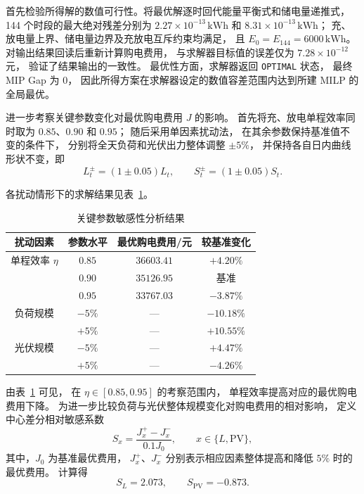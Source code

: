 \documentclass[zihao=-4,a4paper,UTF8,fontset=none]{ctexart}
\begin{document}
首先检验所得解的数值可行性。将最优解逐时回代能量平衡式和储电量递推式，
144 个时段的最大绝对残差分别为
$2.27\times10^{-13}\,\mathrm{kWh}$
和
$8.31\times10^{-13}\,\mathrm{kWh}$；
充、放电量上界、储电量边界及充放电互斥约束均满足，
且 $E_0=E_{144}=6000\,\mathrm{kWh}$。
对输出结果回读后重新计算购电费用，
与求解器目标值的误差仅为
$7.28\times10^{-12}$ 元，
验证了结果输出的一致性。
最优性方面，求解器返回 \texttt{OPTIMAL} 状态，
最终 MIP Gap 为 0，
因此所得方案在求解器设定的数值容差范围内达到所建 MILP 的全局最优。

进一步考察关键参数变化对最优购电费用 $J$ 的影响。
首先将充、放电单程效率同时取为 $0.85$、$0.90$ 和 $0.95$；
随后采用单因素扰动法，
在其余参数保持基准值不变的条件下，
分别将全天负荷和光伏出力整体调整 $\pm5\%$，
并保持各自日内曲线形状不变，即
\begin{equation}
    L_t^{\pm}=(1\pm0.05)L_t,\qquad
    S_t^{\pm}=(1\pm0.05)S_t.
    \label{eq:q1_sensitivity_perturbation}
\end{equation}

各扰动情形下的求解结果见表~\ref{tab:q1_sensitivity}。

\begin{table}[htbp]
    \centering
    \caption{关键参数敏感性分析结果}
    \label{tab:q1_sensitivity}
    \renewcommand{\arraystretch}{1.15}
    \begin{tabular}{cccc}
        \hline
        扰动因素 & 参数水平 & 最优购电费用/元 & 较基准变化 \\
        \hline
        单程效率 $\eta$ & $0.85$ & $36603.41$ & $+4.20\%$ \\
                        & $0.90$ & $35126.95$ & 基准 \\
                        & $0.95$ & $33767.03$ & $-3.87\%$ \\
        \hline
        负荷规模        & $-5\%$ & --- & $-10.18\%$ \\
                        & $+5\%$ & --- & $+10.55\%$ \\
        \hline
        光伏规模        & $-5\%$ & --- & $+4.47\%$ \\
                        & $+5\%$ & --- & $-4.26\%$ \\
        \hline
    \end{tabular}
\end{table}

由表~\ref{tab:q1_sensitivity} 可见，
在 $\eta\in[0.85,0.95]$ 的考察范围内，
单程效率提高对应的最优购电费用下降。
为进一步比较负荷与光伏整体规模变化对购电费用的相对影响，
定义中心差分相对敏感系数
\begin{equation}
    S_x=
    \frac{J_x^{+}-J_x^{-}}{0.1J_0},
    \qquad x\in\{L,\mathrm{PV}\},
    \label{eq:q1_relative_sensitivity}
\end{equation}
其中，$J_0$ 为基准最优费用，
$J_x^{+}$、$J_x^{-}$ 分别表示相应因素整体提高和降低 $5\%$ 时的最优费用。
计算得
\begin{equation}
    S_L=2.073,\qquad
    S_{\mathrm{PV}}=-0.873.
    \label{eq:q1_sensitivity_result}
\end{equation}
\end{document}
